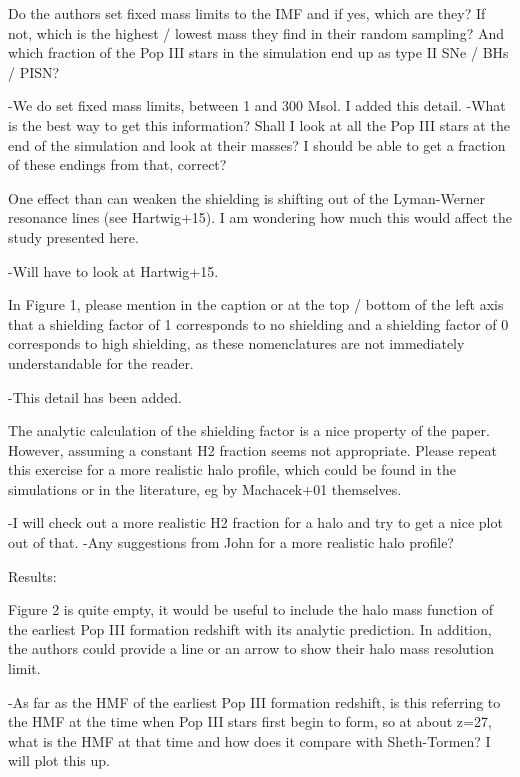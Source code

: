 \documentclass[11pt]{article}
\newenvironment{referee}[1][]{%
    \ignorespaces%
    \begin{mdframed}[style=myquotestyle,#1]%
}{%
    \end{mdframed}%
    \ignorespacesafterend%
}%
\begin{document}
\begin{referee}
Do the authors set fixed mass limits to the IMF and if yes, which are they?  If not, which is the highest / lowest mass they find in their random sampling?  And which fraction of the Pop III stars in the simulation end up as type II SNe / BHs / PISN?
\end{referee}
-We do set fixed mass limits, between 1 and 300 Msol. I added this detail. 
-What is the best way to get this information? Shall I look at all the Pop III stars at the end of the simulation and look at their masses? I should be able to get a fraction of these endings from that, correct?

\begin{referee}
One effect than can weaken the shielding is shifting out of the Lyman-Werner resonance lines (see Hartwig+15). I am wondering how much this would affect the study presented here.
\end{referee}
-Will have to look at Hartwig+15. 

\begin{referee}
In Figure 1, please mention in the caption or at the top / bottom of the left axis that a shielding factor of 1 corresponds to no shielding and a shielding factor of 0 corresponds to high shielding, as these nomenclatures are not immediately understandable for the reader.
\end{referee}
-This detail has been added. 

\begin{referee}
The analytic calculation of the shielding factor is a nice property of the paper. However, assuming a constant H2 fraction seems not appropriate. Please repeat this exercise for a more realistic halo profile, which could be found in the simulations or in the literature, eg by Machacek+01 themselves.
\end{referee}
-I will check out a more realistic H2 fraction for a halo and try to get a nice plot out of that.
-Any suggestions from John for a more realistic halo profile?

\begin{referee}
Results:

Figure 2 is quite empty, it would be useful to include the halo mass function of the earliest Pop III formation redshift with its analytic prediction. In addition, the authors could provide a line or an arrow to show their halo mass resolution limit.
\end{referee}
-As far as the HMF of the earliest Pop III formation redshift, is this referring to the HMF at the time when Pop III stars first begin to form, so at about z=27, what is the HMF at that time and how does it compare with Sheth-Tormen? I will plot this up.
\end{document}
